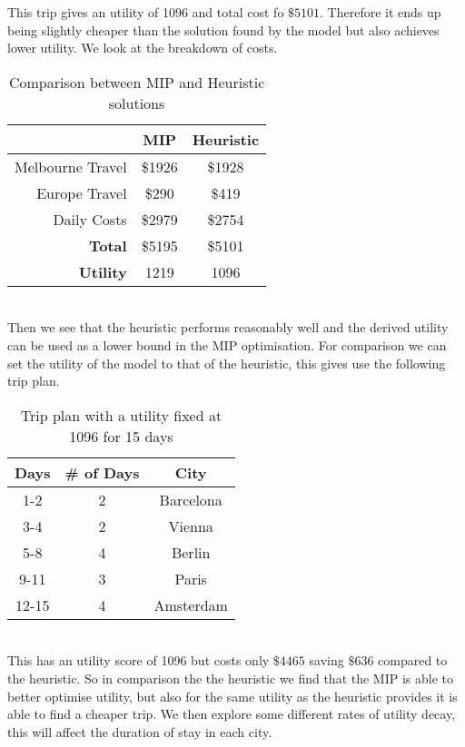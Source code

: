 \documentclass[a4paper]{article}
\begin{document}
This trip gives an utility of 1096 and total cost fo $\$5101$. Therefore it ends up being slightly cheaper than the solution found by the model but also achieves lower utility. We look at the breakdown of costs.\\
\begin{table}[h]
\caption{Comparison between MIP and Heuristic solutions}
\centering
\begin{tabular}{r|c|c}
\hline
& MIP & Heuristic \\
\hline
Melbourne Travel & \$1926 & \$1928 \\
Europe Travel & \$290 & \$419 \\
Daily Costs & \$2979 & \$2754 \\
\hline
\hline
\textbf{Total} & \$5195 & \$5101 \\
\hline
\textbf{Utility} & 1219 & 1096 \\
\hline
\end{tabular}	
\end{table} \\
Then we see that the heuristic performs reasonably well and the derived utility can be used as a lower bound in the MIP optimisation. For comparison we can set the utility of the model to that of the heuristic, this gives use the following trip plan.
\begin{table}[h]
\caption{Trip plan with a utility fixed at 1096 for 15 days}
\centering
\begin{tabular}{c|c|c}
	\hline
	\rule{0pt}{2ex} Days & \# of Days & City \\
	\hline
	1-2 & 2 & Barcelona \\
	3-4 & 2 & Vienna \\
	5-8 & 4 & Berlin \\
	9-11 & 3 & Paris \\
	12-15 & 4 & Amsterdam \\
	\hline
\end{tabular}
\vspace{1mm}
\end{table}\\
This has an utility score of 1096 but costs only $\$4465$ saving $\$636$ compared to the heuristic. So in comparison the the heuristic we find that the MIP is able to better optimise utility, but also for the same utility as the heuristic provides it is able to find a cheaper trip. We then explore some different rates of utility decay, this will affect the duration of stay in each city.
\end{document}

